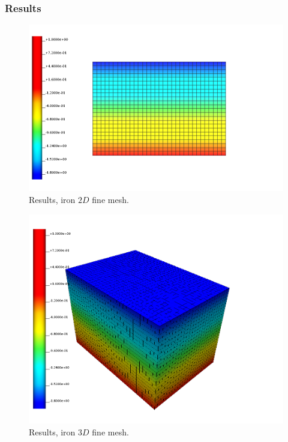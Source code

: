 \subsubsection{Results}
%
\begin{figure}[h!]
    \centering 
    \includegraphics[width=\columnwidth]{examples/example-0101/doc/figures/l160x120x000_n32x24x00_i1_s0.png} 
    \caption{Results, iron $2D$ fine mesh.}
    \label{example-0101-iron-2D-fig}
\end{figure}
%
\begin{figure}[h!]
    \centering 
    \includegraphics[width=\columnwidth]{examples/example-0101/doc/figures/l160x120x120_n32x24x24_i1_s0.png} 
    \caption{Results, iron $3D$ fine mesh.}
    \label{example-0101-iron-3D-fig}
\end{figure}
%
%
